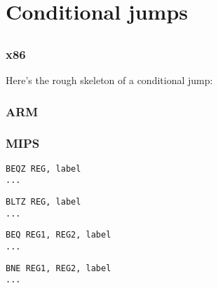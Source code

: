 \chapter{Conditional jumps}
\label{sec:Jcc}






\section{\Conclusion{}}

\subsection{x86}

Here's the rough skeleton of a conditional jump:



\ifdefined\IncludeARM

\subsection{ARM}


\fi

\ifdefined\IncludeMIPS

\subsection{MIPS}

\begin{lstlisting}[caption=Check for zero]
BEQZ REG, label
...
\end{lstlisting}

\begin{lstlisting}[caption=Check for less than zero:]
BLTZ REG, label
...
\end{lstlisting}

\begin{lstlisting}[caption=Check for equal values]
BEQ REG1, REG2, label
...
\end{lstlisting}

\begin{lstlisting}[caption=Check for non-equal values]
BNE REG1, REG2, label
...
\end{lstlisting}

